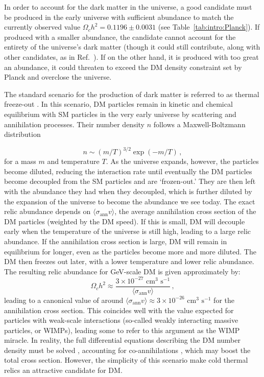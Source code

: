 In order to account for the dark matter in the universe, a good candidate must be produced in the early universe with sufficient abundance to match the currently observed value $\Omega_c h^2 = 0.1196 \pm 0.0031$ (see Table~\ref{tab:intro:Planck}). If produced with a smaller abundance, the candidate cannot account for the entirety of the universe's dark matter (though it could still contribute, along with other candidates, as in Ref.~\cite{Feldman:2010}). If on the other hand, it is produced with too great an abundance, it could threaten to exceed the DM density constraint set by Planck and overclose the universe.

The standard scenario for the production of dark matter is referred to as thermal freeze-out \cite{Kolb:1990}. In this scenario, DM particles remain in kinetic and chemical equilibrium with SM particles in the very early universe by scattering and annihilation processes. Their number density $n$ follows a Maxwell-Boltzmann distribution

\begin{equation}
n \sim (m/T)^{3/2} \exp(-m/T)\,,
\end{equation}
for a mass $m$ and temperature $T$. As the universe expands, however, the particles become diluted, reducing the interaction rate until eventually the DM particles become decoupled from the SM particles and are `frozen-out.' They are then left with the abundance they had when they decoupled, which is further diluted by the expansion of the universe to become the abundance we see today. The exact relic abundance depends on $\langle \sigma_\mathrm{ann} v\rangle$, the average annihilation cross section of the DM particles (weighted by the DM speed). If this is small, DM will decouple early when the temperature of the universe is still high, leading to a large relic abundance. If the annihilation cross section is large, DM will remain in equilibrium  for longer, even as the particles become more and more diluted. The DM then freezes out later, with a lower temperature and lower relic abundance. The resulting relic abundance for GeV-scale DM is given approximately by:
\begin{equation}
\Omega_c h^2 \approx \frac{3 \times 10^{-27} \textrm{ cm}^{3} \textrm{ s}^{-1}}{\langle \sigma_\mathrm{ann} v \rangle}\,,
\end{equation}
leading to a canonical value of around $\langle \sigma_\mathrm{ann} v \rangle \approx 3 \times 10^{-26} \textrm{ cm}^{3} \textrm{ s}^{-1}$ for the annihilation cross section. This coincides well with the value expected for particles with weak-scale interactions (so-called weakly interacting massive particles, or WIMPs), leading some to refer to this argument as the WIMP miracle. In reality, the full differential equations describing the DM number density must be solved \cite{Gelmini:2010}, accounting for co-annihilations \cite{Griest:1991}, which may boost the total cross section. However, the simplicity of this scenario make cold thermal relics an attractive candidate for DM.

